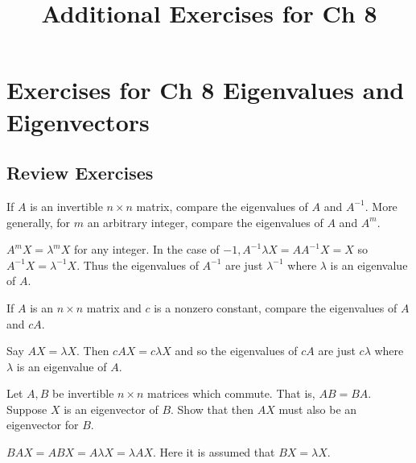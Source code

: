 \documentclass{ximera}
\title{Additional Exercises for Ch 8} \license{CC BY-NC-SA 4.0}
\begin{document}
\begin{abstract}
\end{abstract}
\maketitle

\section*{Exercises for Ch 8 Eigenvalues and Eigenvectors}

\subsection*{Review Exercises}

\begin{problem}\label{prb:8.1} If $A$ is an invertible $n\times n$ matrix, compare the eigenvalues of
$A$ and $A^{-1}$. More generally, for $m$ an arbitrary integer, compare the
eigenvalues of $A$ and $A^{m}$.
\begin{hint}
$A^{m}X=\lambda ^{m}X$ for
any integer. In the case of $-1,A^{-1}\lambda X=AA^{-1}X=X$
so $A^{-1}X =\lambda ^{-1}X$. Thus the eigenvalues of $A^{-1}$ are just $\lambda ^{-1}$ where $\lambda $ is an eigenvalue of $A$.
\end{hint}
\end{problem}

\begin{problem}\label{prb:8.2} If $A$ is an $n\times n$ matrix and $c$ is a nonzero constant, compare
the eigenvalues of $A$ and $cA$. \vspace{1mm}
\begin{hint}
Say $AX=\lambda X.$ Then $
cAX=c\lambda X$ and so the eigenvalues of $cA$ are just $
c\lambda $ where $\lambda $ is an eigenvalue of $A$.
\end{hint}
\end{problem}

\begin{problem}\label{prb:8.3} Let $A,B$ be invertible $n\times n$ matrices which commute. That is, $AB=BA$. Suppose $X$ is an eigenvector of $B$. Show that then
$AX$ must also be an eigenvector for $B$. \vspace{1mm}
\begin{hint}
 $BAX=ABX
=A\lambda X=\lambda AX$. Here it is assumed that $BX=\lambda X$.
\end{hint}
\end{problem}
\end{document}
